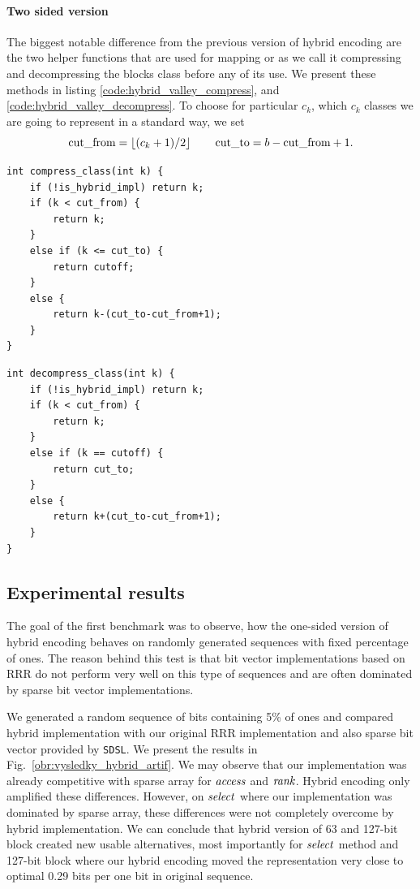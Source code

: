 \paragraph{Two sided version}

The biggest notable difference from the previous version of hybrid encoding are the two
helper functions that are used for mapping or as we call it compressing and decompressing
the blocks class before any of its use. We present these methods in listing \ref{code:hybrid_valley_compress},
and \ref{code:hybrid_valley_decompress}. To choose for particular $c_k$, which $c_k$ classes we are
going to represent in a standard way, we set
$$\text{cut\_from} = \left\lfloor (c_k+1)/2 \right\rfloor\qquad \text{cut\_to} = b-\text{cut\_from}+1.$$

\begin{lstlisting}
int compress_class(int k) {
	if (!is_hybrid_impl) return k;
	if (k < cut_from) {
		return k;
	}
	else if (k <= cut_to) {
		return cutoff;
	}
	else {
		return k-(cut_to-cut_from+1);
	}
}
\end{lstlisting}

\begin{lstlisting}
int decompress_class(int k) {
	if (!is_hybrid_impl) return k;
	if (k < cut_from) {
		return k;
	}
	else if (k == cutoff) {
		return cut_to;
	}
	else {
		return k+(cut_to-cut_from+1);
	}
}
\end{lstlisting}

\subsection{Experimental results}

The goal of the first benchmark was to observe, how the one-sided version of hybrid encoding
behaves on randomly generated sequences with fixed percentage of ones. The reason behind this
test is that bit vector implementations based on RRR do not perform very well on this type of
sequences and are often dominated by sparse bit vector implementations.

We generated a random sequence of bits containing 5\% of ones and compared hybrid implementation
with our original RRR implementation and also sparse bit vector provided by \texttt{SDSL}. We
present the results in Fig.~\ref{obr:vysledky_hybrid_artif}. We may observe that our implementation
was already competitive with sparse array for $\mathit{access}$ and $\mathit{rank}$. Hybrid encoding only amplified
these differences. However, on $\mathit{select}$ where our implementation was dominated by sparse array,
these differences were not completely overcome by hybrid implementation. We can conclude
that hybrid version of 63 and 127-bit block created new usable alternatives, most importantly for
$\mathit{select}$ method and 127-bit block where our hybrid encoding moved the representation very close
to optimal 0.29 bits per one bit in original sequence.

